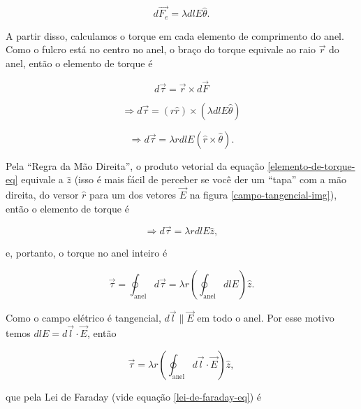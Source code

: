 \documentclass[
	article,
	11pt,
	oneside,
	a4paper,
	english,
	brazil,
	sumario=tradicional
	]{abntex2}
\begin{document}
\begin{equation}
    d \vec{F_e} =  \lambda dl E \hat{\theta}.
\end{equation}

A partir disso, calculamos o torque em cada elemento de comprimento do anel. Como o fulcro está no centro no anel, o braço do torque equivale ao raio $\vec{r}$ do anel, então o elemento de torque é

\begin{equation}
    d \vec{\tau} = \vec{r} \times d\vec{F}
\end{equation}

\begin{equation}
    \Rightarrow d \vec{\tau} = \left(r \hat{r}\right) \times \left(\lambda dl E \hat{\theta}\right)
\end{equation}

\begin{equation} \label{elemento-de-torque-eq}
    \Rightarrow d \vec{\tau} = \lambda r dl E \left(\hat{r} \times \hat{\theta}\right).
\end{equation}

Pela ``Regra da Mão Direita'', o produto vetorial da equação \ref{elemento-de-torque-eq} equivale a $\hat{z}$ (isso é mais fácil de perceber se você der um ``tapa'' com a mão direita, do versor $\hat{r}$ para um dos vetores $\vec{E}$ na figura \ref{campo-tangencial-img}), então o elemento de torque é

\begin{equation}
    \Rightarrow d \vec{\tau} = \lambda r dl E \hat{z},
\end{equation}

\noindent e, portanto, o torque no anel inteiro é

\begin{equation}
    \vec{\tau} = \oint_{\text{anel}} d \vec{\tau} = \lambda r \left(\oint_{\text{anel}} dl E\right) \hat{z}.
\end{equation}

Como o campo elétrico é tangencial, $d\vec{l} \parallel \vec{E}$ em todo o anel. Por esse motivo temos $dl E = d\vec{l} \cdot \vec{E} $, então

\begin{equation}
    \vec{\tau} = \lambda r \left(\oint_{\text{anel}} d\vec{l} \cdot \vec{E}\right) \hat{z},
\end{equation}

\noindent que pela Lei de Faraday (vide equação \ref{lei-de-faraday-eq}) é
\end{document}
